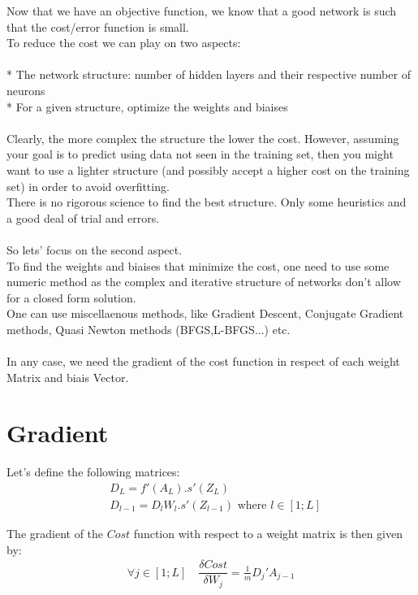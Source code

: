 \documentclass[]{article}
\begin{document}
Now that we have an objective function, we know that a good network is such that the cost/error function is small.\\
To reduce the cost we can play on two aspects:\\
\\
* The network structure: number of hidden layers and their respective number of neurons\\
* For a given structure, optimize the weights and biaises\\
\\
Clearly, the more complex the structure the lower the cost. However, assuming your goal is to predict using data not seen in the training set, then you might want to use a lighter structure (and possibly accept a higher cost on the training set) in order to avoid overfitting.\\
There is no rigorous science to find the best structure. Only some heuristics and a good deal of trial and errors.\\
\\
So lets' focus on the second aspect.\\
To find the weights and biaises that minimize the cost, one need to use some numeric method as the complex and iterative structure of networks don't allow for a closed form solution.\\
One can use miscellaenous methods, like Gradient Descent, Conjugate Gradient methods, Quasi Newton  methods (BFGS,L-BFGS...)  etc.\\
\\
In any  case, we need the gradient of the cost function in respect of each weight Matrix and biais Vector.\\


\section{Gradient}


Let's define the following matrices:\\
\begin{align}
&D_{L}=f'(A_L).s'(Z_L) \label{eq:Dl} \\
&D_{l-1}=D_{l}W_{l}.s'(Z_{l-1}) \text{ where $l \in [1;L]$} \label{eq:Dkz}
\end{align} 

The gradient of the $Cost$ function with respect to a weight matrix is then given by:\\

\begin{align}
\forall j \in [1;L] \quad \dfrac{\delta Cost}{\delta W_{j}}=\frac{1}{m}   D_{j}'  A_{j-1} \label{eq:grad}
\end{align}
\end{document}
